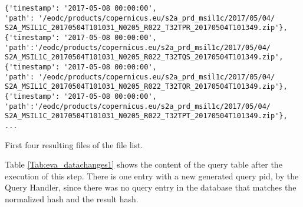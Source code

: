 \documentclass[draft,final]{vutinfth} %
\newenvironment{code}{\captionsetup{type=listing}}{}
\begin{document}
\begin{enumerate}
	\begin{code}
		\begin{verbatim}
{'timestamp': '2017-05-08 00:00:00', 
'path': '/eodc/products/copernicus.eu/s2a_prd_msil1c/2017/05/04/
S2A_MSIL1C_20170504T101031_N0205_R022_T32TPR_20170504T101349.zip'}, 
{'timestamp': '2017-05-08 00:00:00',
'path':'/eodc/products/copernicus.eu/s2a_prd_msil1c/2017/05/04/
S2A_MSIL1C_20170504T101031_N0205_R022_T32TQS_20170504T101349.zip', 
{'timestamp': '2017-05-08 00:00:00', 
'path': '/eodc/products/copernicus.eu/s2a_prd_msil1c/2017/05/04/
S2A_MSIL1C_20170504T101031_N0205_R022_T32TQR_20170504T101349.zip'}, 
{'timestamp': '2017-05-08 00:00:00',
'path':'/eodc/products/copernicus.eu/s2a_prd_msil1c/2017/05/04/
S2A_MSIL1C_20170504T101031_N0205_R022_T32TPT_20170504T101349.zip'},
...
		\end{verbatim}
		\caption{First four resulting files of the file list.}
		\label{lst:eva_datachange_rf1}
	\end{code}

Table \ref{Tab:eva_datachanges1} shows the content of the query table after the execution of this step. There is one entry with a new generated query pid, by the Query Handler, since there was no query entry in the database that matches the normalized hash and the result hash. 



\end{enumerate}
\end{document}
